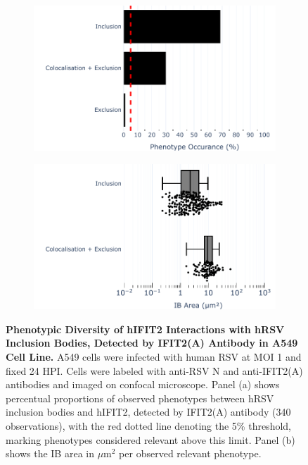 \begin{figure}
    \begin{subfigure}{0.495\textwidth}
        \caption{}
        \includegraphics[width=1\linewidth]{08. Chapter 3/Figs/02. Infection/02. IFIT2/01. IFIT2A/01. bar_i2a_a549.pdf}
    \end{subfigure}
    \begin{subfigure}{0.495\textwidth}
        \caption{}
        \includegraphics[width=1\linewidth]{08. Chapter 3/Figs/02. Infection/02. IFIT2/01. IFIT2A/02. box_i2a_a549.pdf}
    \end{subfigure}
    \caption[Phenotypic Diversity of hIFIT2 Interactions with hRSV Inclusion Bodies, Detected by IFIT2(A) Antibody in A549 Cell Line.]{\textbf{Phenotypic Diversity of hIFIT2 Interactions with hRSV Inclusion Bodies, Detected by IFIT2(A) Antibody in A549 Cell Line.} A549 cells were infected with human RSV at MOI 1 and fixed 24 HPI. Cells were labeled with anti-RSV N and anti-IFIT2(A) antibodies and imaged on confocal microscope. Panel (a) shows percentual proportions of observed phenotypes between hRSV inclusion bodies and hIFIT2, detected by IFIT2(A) antibody (340 observations), with the red dotted line denoting the 5\% threshold, marking phenotypes considered relevant above this limit. Panel (b) shows the IB area in \(\mu \mbox{m}^2\) per observed relevant phenotype.}
    \label{fig:Phenotypic Diversity of hIFIT2 Interactions with hRSV Inclusion Bodies, Detected by IFIT2(A) Antibody in A549 Cell Line}
\end{figure}

